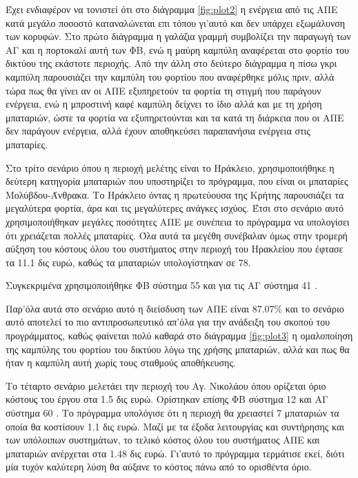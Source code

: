 \documentclass[12pt]{report}
\begin{document}
Έχει ενδιαφέρον να τονιστεί ότι στο διάγραμμα \ref{fig:plot2} η ενέργεια από τις ΑΠΕ κατά μεγάλο ποσοστό καταναλώνεται επι τόπου γι'αυτό και δεν υπάρχει εξωμάλυνση των κορυφών. Στο πρώτο διάγραμμα η γαλάζια γραμμή συμβολίζει την
παραγωγή των ΑΓ και η πορτοκαλί αυτή των ΦΒ, ενώ η μαύρη καμπύλη αναφέρεται στο φορτίο του δικτύου της εκάστοτε περιοχής. Από την άλλη στο δεύτερο διάγραμμα η πίσω γκρι καμπύλη παρουσιάζει την καμπύλη του φορτίου που αναφέρθηκε
μόλις πριν, αλλά τώρα πως θα γίνει αν οι ΑΠΕ εξυπηρετούν τα φορτία τη στιγμή που παράγουν ενέργεια, ενώ η μπροστινή καφέ καμπύλη δείχνει το ίδιο αλλά και με τη χρήση μπαταριών, ώστε τα φορτία να εξυπηρετούνται και τα κατά τη
διάρκεια που οι ΑΠΕ δεν παράγουν ενέργεια, αλλά έχουν αποθηκεύσει παραπανήσια ενέργεια στις μπαταρίες.

Στο τρίτο σενάριο όπου η περιοχή μελέτης είναι το Ηράκλειο, χρησιμοποιήθηκε η δεύτερη κατηγορία μπαταριών που υποστηρίζει το πρόγραμμα, που είναι οι μπαταρίες Μολύβδου-Άνθρακα. Το Ηράκλειο όντας η πρωτεύουσα της Κρήτης παρουσιάζει
τα μεγαλύτερα φορτία, άρα και τις μεγαλύτερες ανάγκες ισχύος. Έτσι στο σενάριο αυτό χρησιμοποιήθηκαν μεγάλες ποσότητες ΑΠΕ με συνέπεια το πρόγραμμα να υπολογίσει ότι χρειάζεται πολλές μπαταρίες. 
Όλα αυτά τα μεγέθη συνέβαλαν όμως στην τρομερή αύξηση του κόστους όλου του συστήματος στην περιοχή του Ηρακλείου που έφτασε τα 11.1 δις ευρώ, καθώς τα {} μπαταριών υπολογίστηκαν σε 78. 

Συγκεκριμένα χρησιμοποιήθηκε ΦΒ σύστημα 55 {} και για τις ΑΓ σύστημα 41 {}.

Παρ'όλα αυτά στο σενάριο αυτό η διείσδυση των ΑΠΕ είναι 87.07\% και το σενάριο αυτό αποτελεί το πιο αντιπροσωπευτικό απ'όλα για την ανάδειξη του σκοπού του προγράμματος, καθώς φαίνεται πολύ καθαρά στο διάγραμμα 
\ref{fig:plot3} η ομαλοποίηση της καμπύλης του φορτίου του δικτύου λόγω της χρήσης μπαταριών, αλλά και πως θα ήταν η καμπύλη αυτή χωρίς τους σταθμούς αποθήκευσης.

\begin{center}
\end{center}

Το τέταρτο σενάριο μελετάει την περιοχή του Αγ. Νικολάου όπου ορίζεται όριο κόστους του έργου στα 1.5 δις ευρώ. Ορίστηκαν επίσης ΦΒ σύστημα 12 {} και ΑΓ σύστημα 60 {}. Το πρόγραμμα υπολόγισε ότι η
περιοχή θα χρειαστεί 7 {} μπαταριών τα οποία θα κοστίσουν 1.1 δις ευρώ. Μαζί με τα έξοδα λειτουργίας και συντήρησης και των υπόλοιπων συστημάτων, το τελικό κόστος όλου του συστήματος ΑΠΕ και μπαταριών ανέρχεται στα
1.48 δις ευρώ. Γι'αυτό το πρόγραμμα τερμάτισε εκεί, διότι μία τυχόν καλύτερη λύση θα αύξανε το κόστος πάνω από το ορισθέντα όριο.
\end{document}
